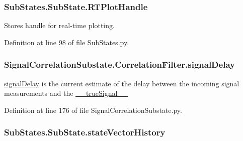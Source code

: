 \subsubsection[{\texorpdfstring{R\+T\+Plot\+Handle}{RTPlotHandle}}]{\setlength{\rightskip}{0pt plus 5cm}Sub\+States.\+Sub\+State.\+R\+T\+Plot\+Handle\hspace{0.3cm}{\ttfamily [inherited]}}\hypertarget{classSubStates_1_1SubState_ab92a0fafcfd778b8965e3f649ff94fc7}{}\label{classSubStates_1_1SubState_ab92a0fafcfd778b8965e3f649ff94fc7}


Stores handle for real-\/time plotting. 



Definition at line 98 of file Sub\+States.\+py.

\subsubsection[{\texorpdfstring{signal\+Delay}{signalDelay}}]{\setlength{\rightskip}{0pt plus 5cm}Signal\+Correlation\+Substate.\+Correlation\+Filter.\+signal\+Delay}\hypertarget{classSignalCorrelationSubstate_1_1CorrelationFilter_a01e35890dee1d79bd0e4f9e82cb16e3f}{}\label{classSignalCorrelationSubstate_1_1CorrelationFilter_a01e35890dee1d79bd0e4f9e82cb16e3f}


\hyperlink{classSignalCorrelationSubstate_1_1CorrelationFilter_a01e35890dee1d79bd0e4f9e82cb16e3f}{signal\+Delay} is the current estimate of the delay between the incoming signal measurements and the \hyperlink{classSignalCorrelationSubstate_1_1CorrelationFilter_a5f777d3a877658a1365ebac65b9ab25b}{\+\_\+\+\_\+true\+Signal\+\_\+\+\_\+} 



Definition at line 176 of file Signal\+Correlation\+Substate.\+py.

\subsubsection[{\texorpdfstring{state\+Vector\+History}{stateVectorHistory}}]{\setlength{\rightskip}{0pt plus 5cm}Sub\+States.\+Sub\+State.\+state\+Vector\+History\hspace{0.3cm}{\ttfamily [inherited]}}\hypertarget{classSubStates_1_1SubState_a24bf2de56fc3037d91cba43d28f3bf60}{}\label{classSubStates_1_1SubState_a24bf2de56fc3037d91cba43d28f3bf60}


